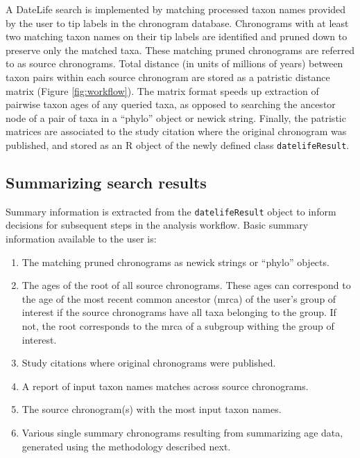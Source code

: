 \documentclass[
  man]{apa6}
\providecommand{\tightlist}{%
  \setlength{\itemsep}{0pt}\setlength{\parskip}{0pt}}
\begin{document}
A DateLife search is implemented by matching processed taxon names provided by the user to tip labels in the chronogram database. Chronograms with at least two matching taxon names on their tip labels are identified and pruned down to preserve only the matched taxa.
These matching pruned chronograms are referred to as source chronograms.
Total distance (in units of millions of years) between taxon pairs within each source chronogram are stored as a patristic distance matrix (Figure \ref{fig:workflow}).
The matrix format speeds up extraction of pairwise taxon ages of any queried taxa, as opposed to searching the ancestor node of a pair of taxa in a ``phylo'' object or newick string.
Finally, the patristic matrices are associated to the study citation where the original chronogram was published, and stored as an R object of the newly defined class \texttt{datelifeResult}.

\hypertarget{summarizing-search-results}{%
\subsection{Summarizing search results}\label{summarizing-search-results}}

Summary information is extracted from the \texttt{datelifeResult} object to inform decisions for subsequent steps in the analysis workflow. Basic summary information available to the user is:

\begin{enumerate}
\def\labelenumi{\arabic{enumi}.}
\tightlist
\item
  The matching pruned chronograms as newick strings or ``phylo'' objects.
\item
  The ages of the root of all source chronograms. These ages can correspond to the age of the most recent common ancestor (mrca) of the user's group of interest if the source chronograms have all taxa belonging to the group. If not, the root corresponds to the mrca of a subgroup withing the group of interest.
\item
  Study citations where original chronograms were published.
\item
  A report of input taxon names matches across source chronograms.
\item
  The source chronogram(s) with the most input taxon names.
\item
  Various single summary chronograms resulting from summarizing age data, generated using the methodology described next.
\end{enumerate}
\end{document}
